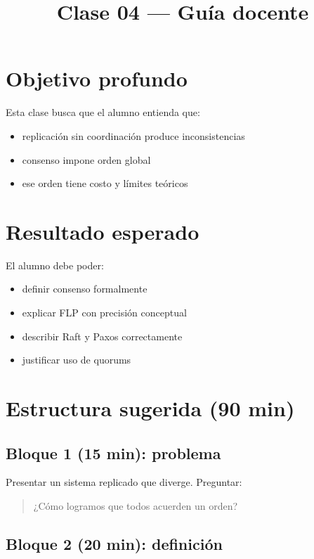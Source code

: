 \documentclass[variant=docente,cover=institutional,mode=screen]{ua-engineering-v6-article}
\title{Clase 04 --- Guía docente}
\author{\UAProfessor}
\date{\UADate}
\begin{document}
\maketitle

\section{Objetivo profundo}

Esta clase busca que el alumno entienda que:

\begin{itemize}
\item replicación sin coordinación produce inconsistencias
\item consenso impone orden global
\item ese orden tiene costo y límites teóricos
\end{itemize}

\section{Resultado esperado}

El alumno debe poder:

\begin{itemize}
\item definir consenso formalmente
\item explicar FLP con precisión conceptual
\item describir Raft y Paxos correctamente
\item justificar uso de quorums
\end{itemize}

\section{Estructura sugerida (90 min)}

\subsection*{Bloque 1 (15 min): problema}

Presentar un sistema replicado que diverge.
Preguntar:
\begin{quote}
¿Cómo logramos que todos acuerden un orden?
\end{quote}

\subsection*{Bloque 2 (20 min): definición}
\end{document}
